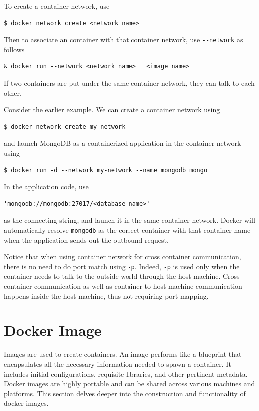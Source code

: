 To create a container network, use
\begin{lstlisting}
$ docker network create <network name>
\end{lstlisting}
Then to associate an container with that container network, use \verb|--network| as follows
\begin{lstlisting}
& docker run --network <network name>	<image name>
\end{lstlisting}
If two containers are put under the same container network, they can talk to each other. 

Consider the earlier example. We can create a container network using
\begin{lstlisting}
$ docker network create my-network
\end{lstlisting}
and launch MongoDB as a containerized application in the container network using
\begin{lstlisting}
$ docker run -d --network my-network --name mongodb mongo
\end{lstlisting}
In the application code, use
\begin{lstlisting}
'mongodb://mongodb:27017/<database name>'	
\end{lstlisting}
as the connecting string, and launch it in the same container network. Docker will automatically resolve \verb|mongodb| as the correct container with that container name when the application sends out the outbound request.

Notice that when using container network for cross container communication, there is no need to do port match using \verb|-p|. Indeed, \verb|-p| is used only when the container needs to talk to the outside world through the host machine. Cross container communication as well as container to host machine communication happens inside the host machine, thus not requiring port mapping.

\section{Docker Image} \label{ch:vac:sec:di}

Images are used to create containers. An image performs like a blueprint that encapsulates all the necessary information needed to spawn a container. It includes initial configurations, requisite libraries, and other pertinent metadata. Docker images are highly portable and can be shared across various machines and platforms. This section delves deeper into the construction and functionality of docker images.

